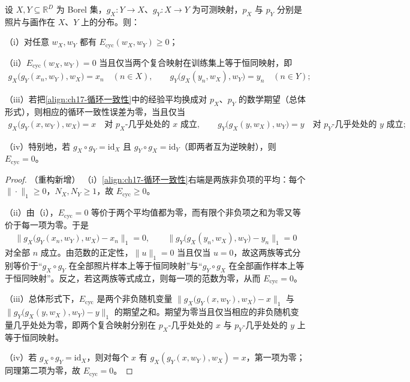 \documentclass[../../main.tex]{subfiles}
\begin{document}
\begin{proposition}[循环一致性误差的性质]\label{proposition:ch17-循环一致性}
设 $X,Y\subseteq\mathbb{R}^D$ 为 Borel 集，$g_X:Y\to X$、$g_Y:X\to Y$ 为可测映射，$p_X$ 与 $p_Y$ 分别是照片与画作在 $X$、$Y$ 上的分布。则：

（i）对任意 $w_X,w_Y$ 都有 $E_{\mathrm{cyc}}(w_X,w_Y)\geqslant0$；

（ii）$E_{\mathrm{cyc}}(w_X,w_Y)=0$ 当且仅当两个复合映射在训练集上等于恒同映射，即
\begin{align*}
g_X\big(g_Y(x_n,w_Y),w_X\big)=x_n\quad(n\in X),\qquad
g_Y\big(g_X(y_n,w_X),w_Y\big)=y_n\quad(n\in Y);
\end{align*}

（iii）若把\eqref{align:ch17-循环一致性}中的经验平均换成对 $p_X$、$p_Y$ 的数学期望（总体形式），则相应的循环一致性误差为零，当且仅当
\begin{align*}
g_X\big(g_Y(x,w_Y),w_X\big)=x\quad\text{对 }p_X\text{-几乎处处的 }x\text{ 成立},\qquad
g_Y\big(g_X(y,w_X),w_Y\big)=y\quad\text{对 }p_Y\text{-几乎处处的 }y\text{ 成立};
\end{align*}

（iv）特别地，若 $g_X\circ g_Y=\mathrm{id}_X$ 且 $g_Y\circ g_X=\mathrm{id}_Y$（即两者互为逆映射），则 $E_{\mathrm{cyc}}=0$。
\end{proposition}

\begin{proof}（重构新增）
（i）\eqref{align:ch17-循环一致性}右端是两族非负项的平均：每个 $\|\cdot\|_1\geqslant0$，$N_X,N_Y\geqslant1$，故 $E_{\mathrm{cyc}}\geqslant0$。

（ii）由（i），$E_{\mathrm{cyc}}=0$ 等价于两个平均值都为零，而有限个非负项之和为零又等价于每一项为零。于是
\begin{align*}
\big\|g_X\big(g_Y(x_n,w_Y),w_X\big)-x_n\big\|_1=0,\qquad
\big\|g_Y\big(g_X(y_n,w_X),w_Y\big)-y_n\big\|_1=0
\end{align*}
对全部 $n$ 成立。由范数的正定性，$\|u\|_1=0$ 当且仅当 $u=0$，故这两族等式分别等价于“$g_X\circ g_Y$ 在全部照片样本上等于恒同映射”与“$g_Y\circ g_X$ 在全部画作样本上等于恒同映射”。反之，若这两族等式成立，则每一项的范数为零，从而 $E_{\mathrm{cyc}}=0$。

（iii）总体形式下，$E_{\mathrm{cyc}}$ 是两个非负随机变量 $\big\|g_X\big(g_Y(x,w_Y),w_X\big)-x\big\|_1$ 与 $\big\|g_Y\big(g_X(y,w_X),w_Y\big)-y\big\|_1$ 的期望之和。期望为零当且仅当相应的非负随机变量几乎处处为零，即两个复合映射分别在 $p_X$-几乎处处的 $x$ 与 $p_Y$-几乎处处的 $y$ 上等于恒同映射。

（iv）若 $g_X\circ g_Y=\mathrm{id}_X$，则对每个 $x$ 有 $g_X(g_Y(x,w_Y),w_X)=x$，第一项为零；同理第二项为零，故 $E_{\mathrm{cyc}}=0$。
\end{proof}
\end{document}
